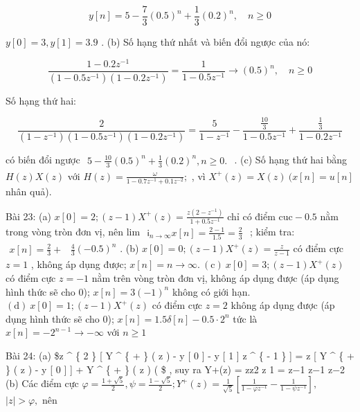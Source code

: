 \documentclass[
  10
]{article}
\begin{document}
\[
y [ n ] = 5 - \frac {7}{3} (0. 5) ^ {n} + \frac {1}{3} (0. 2) ^ {n}, \quad n \geq 0
\]

\(y [ 0 ] = 3 , y [ 1 ] = 3 . 9\) . (b) Số hạng thứ nhất và biến đổi
ngược của nó:

\[
\frac {1 - 0 . 2 z ^ {- 1}}{(1 - 0 . 5 z ^ {- 1}) (1 - 0 . 2 z ^ {- 1})} = \frac {1}{1 - 0 . 5 z ^ {- 1}} \longrightarrow (0. 5) ^ {n}, \quad n \geq 0
\]

Số hạng thứ hai:

\[
{\frac {2}{(1 - z ^ {- 1}) (1 - 0 . 5 z ^ {- 1}) (1 - 0 . 2 z ^ {- 1})}} = {\frac {5}{1 - z ^ {- 1}}} - {\frac {{\frac {1 0}{3}}}{{1 - 0 . 5 z ^ {- 1}}}} + {\frac {{\frac {1}{3}}}{{1 - 0 . 2 z ^ {- 1}}}}
\]

có biến đổi ngược
\(\begin{array} { r } { 5 - \frac { 1 0 } { 3 } ( 0 . 5 ) ^ { n } + \frac { 1 } { 3 } ( 0 . 2 ) ^ { n } , n \geq 0 . } \end{array}\)
. (c) Số hạng thứ hai bằng \(H ( z ) X ( z )\) với
\(H ( z ) = \frac { \omega } { 1 - 0 . 7 z ^ { - 1 } + 0 . 1 z ^ { - 2 } } ;\)
, vì \(X ^ { + } ( z ) = X ( z ) \ ( x [ n ] = u [ n ]\) nhân quả).

Bài 23: (a)
\(x [ 0 ] = 2 ; ( z - 1 ) X ^ { + } ( z ) = \frac { z ( 2 - z ^ { - 1 } ) } { 1 + 0 . 5 z ^ { - 1 } }\)
chỉ có điểm \(\mathrm { c u c - 0 . 5 }\) nằm trong vòng tròn đơn vị,
nên lim
\(\begin{array} { r } { \mathsf { i } _ { n \to \infty } x [ n ] = \frac { 2 - 1 } { 1 . 5 } = \frac { 2 } { 3 } } \end{array}\)
; kiểm tra:
\(\begin{array} { r } { x [ n ] = \frac { 2 } { 3 } + } \end{array}\)
\({ \frac { 4 } { 3 } } ( - 0 . 5 ) ^ { n }\) . (b)
\(x [ 0 ] = 0 ; ( z - 1 ) X ^ { + } ( z ) = \frac { z } { z - 1 }\) có
điểm cực \(z = 1\) , không áp dụng được;
\(x [ n ] = n \to \infty . \mathrm { ~ ( c ) ~ } x [ 0 ] = 3 ; ( z - 1 ) X ^ { + } ( z )\)
có điểm cực \(z = - 1\) nằm trên vòng tròn đơn vị, không áp dụng được
(áp dụng hình thức sẽ cho 0); \(x [ n ] = 3 ( - 1 ) ^ { n }\) không có
giới hạn.
\(( \mathrm { d } ) \ x [ 0 ] = 1 ; ( z - 1 ) X ^ { + } ( z )\) có điểm
cực \(z = 2\) không áp dụng được (áp dụng hình thức sẽ cho 0);
\(x [ n ] = 1 . 5 \delta [ n ] - 0 . 5 \cdot 2 ^ { n }\) tức là
\(x [ n ] = - 2 ^ { n - 1 } \to - \infty\) với \(n \geq 1\)

Bài 24: (a) \$z \^{} \{ 2 \} {[} Y \^{} \{ + \} ( z ) - y {[} 0 {]} - y
{[} 1 {]} z \^{} \{ - 1 \} {]} = z {[} Y \^{} \{ + \} ( z ) - y {[} 0
{]} {]} + Y \^{} \{ + \} ( z ) ( \$ , suy ra Y+(z) = zz2 z 1 = z−1 z−1
z−2 (b) Các điểm cực
\({ \varphi } = \textstyle \frac { 1 + \sqrt { 5 } } { 2 } , { \psi } = \textstyle \frac { 1 - \sqrt { 5 } } { 2 } ; { Y } ^ { + } ( z ) = \textstyle \frac { 1 } { \sqrt { 5 } } \left[ \frac { 1 } { 1 - { \varphi } z ^ { - 1 } } - \frac { 1 } { 1 - { \psi } z ^ { - 1 } } \right] ,\)
\(| z | > \varphi ,\) nên
\end{document}
